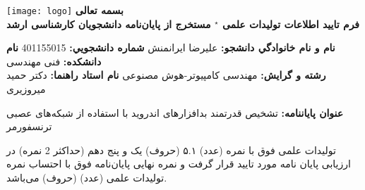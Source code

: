 \renewcommand{\thefootnote}{\fnsymbol{footnote}}
\thispagestyle{empty}
\begin{landscape}
\begin{center}
\texttt{[image: logo]}
\vskip -3mm
{\bfseries \fontsize{11}{12}\selectfont
	بسمه تعالی} \\
\vskip -2mm
{\bfseries \fontsize{11}{12}\selectfont
فرم تایید اطلاعات تولیدات علمی
$^\star$
مستخرج از پایان‌نامه دانشجويان کارشناسی ارشد
}\\
\end{center}
\begin{center}
\fontsize{12}{13}\selectfont

 \textbf{نام و نام خانوادگي دانشجو: }
علیرضا ایرانمنش
\textbf{شماره دانشجويي:}
401155015
\textbf{نام دانشکده:}
فنی مهندسی\\
\textbf{رشته و گرايش:}
مهندسی کامپیوتر-هوش مصنوعی
\textbf{نام استاد راهنما:}
دکتر حمید میروزیری\\
\end{center}
\begin{center}
	{\small{}}
	\textbf{عنوان پایان\/نامه:}
	تشخیص قدرتمند بدافزار‌های اندروید با استفاده از شبکه‌های عصبی ترنسفورمر

	\end{center}
\fontsize{9}{10}\selectfont
\begin{center}
تولیدات علمی فوق با نمره (عدد) ۵.۱ (حروف) یک و پنج دهم (حداکثر 2 نمره) در ارزیابی پایان نامه مورد تایید قرار گرفت و نمره نهایی پایان‌نامه فوق با احتساب نمره تولیدات علمی   (عدد)            (حروف)  می‌باشد.


\end{center}
\end{landscape}

